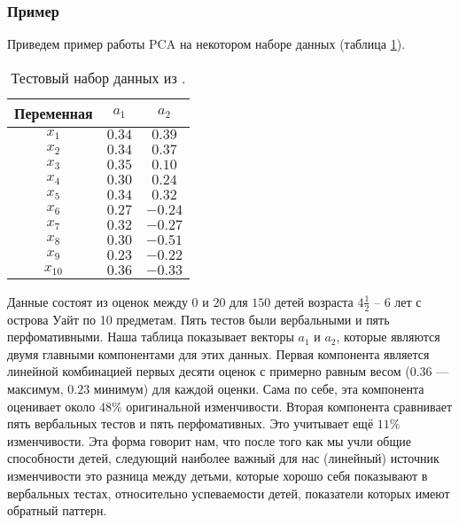 \newpage
\subsubsection*{Пример}
Приведем пример работы PCA на некотором наборе данных (таблица \ref{tab:pca-example}).

\begin{table}[h]
    \begin{center}
        \begin{tabular}{ |c|c|c| } 
            \hline
            Переменная & $a_1$ & $a_2$ \\ 
            \hline
            $x_1$ & $0.34$ & $0.39$ \\ 
            \hline
            $x_2$ & $0.34$ & $0.37$ \\ 
            \hline
            $x_3$ & $0.35$ & $0.10$ \\ 
            \hline
            $x_4$ & $0.30$ & $0.24$ \\ 
            \hline
            $x_5$ & $0.34$ & $0.32$ \\ 
            \hline
            $x_6$ & $0.27$ & $-0.24$ \\ 
            \hline
            $x_7$ & $0.32$ & $-0.27$ \\ 
            \hline
            $x_8$ & $0.30$ & $-0.51$ \\ 
            \hline
            $x_9$ & $0.23$ & $-0.22$ \\ 
            \hline
            $x_{10}$ & $0.36$ & $-0.33$ \\ 
            \hline
        \end{tabular}
    \end{center}
    \caption{Тестовый набор данных из \cite{pca}.}
    \label{tab:pca-example}
\end{table}

Данные состоят из оценок между $0$ и $20$ для $150$ детей возраста $4 \frac{1}{2}$ -- $6$ лет с острова Уайт по 10 предметам. 
Пять тестов были вербальными и пять перфомативными.
Наша таблица показывает векторы $a_1$ и $a_2$, которые являются двумя главными компонентами для этих данных. 
Первая компонента является линейной комбинацией первых десяти оценок с примерно равным весом ($0.36$ --- максимум, $0.23$ минимум) для каждой оценки. 
Сама по себе, эта компонента оценивает около $48\%$ оригинальной изменчивости. 
Вторая компонента сравнивает пять вербальных тестов и пять перфомативных. 
Это учитывает ещё $11\%$ изменчивости. 
Эта форма говорит нам, что после того как мы учли общие способности детей, следующий наиболее важный для нас (линейный) источник изменчивости это разница между детьми, которые хорошо себя показывают в вербальных тестах, относительно успеваемости детей, показатели которых имеют обратный паттерн.

